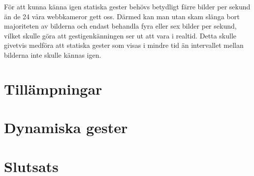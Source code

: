 \documentclass[../rapport_MVEX01-11-05]{subfiles}
\begin{document}
För att kunna känna igen statiska gester behövs betydligt färre bilder per
sekund än de 24 våra webbkameror gett oss. Därmed kan man utan skam slänga
bort majoriteten av bilderna och endast behandla fyra eller sex bilder per
sekund, vilket skulle göra att gestigenkänningen ser ut att vara i realtid.
Detta skulle givetvis medföra att statiska gester som visas i mindre tid
än intervallet mellan bilderna inte skulle kännas igen.


\section{Tillämpningar}

\section{Dynamiska gester}





\section{Slutsats}
\end{document}
